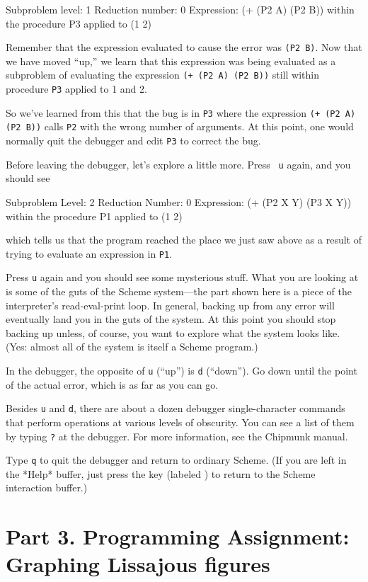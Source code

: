 \beginlisp
Subproblem level: 1 Reduction number: 0
Expression:
(+ (P2 A) (P2 B))
within the procedure P3
applied to (1 2)
\endlisp

Remember that the expression evaluated to cause the error was {\tt (P2
B)}.  Now that we have moved ``up,'' we learn that this expression was
being evaluated as a subproblem of evaluating the expression {\tt (+
(P2 A) (P2 B))} still within procedure {\tt P3} applied to 1 and 2.

So we've learned from this that the bug is in {\tt P3} where the
expression {\tt (+ (P2 A) (P2 B))} calls {\tt P2} with the wrong
number of arguments.  At this point, one would normally quit the
debugger and edit {\tt P3} to correct the bug.

Before leaving the debugger, let's explore a little more.  Press {\tt
u} again, and you should see

\beginlisp
Subproblem Level: 2  Reduction Number: 0
Expression:
(+ (P2 X Y) (P3 X Y))
within the procedure P1
applied to (1 2)
\endlisp

which tells us that the program reached the place we just saw above as
a result of trying to evaluate an expression in {\tt P1}.

Press {\tt u} again and you should see some mysterious stuff.  What
you are looking at is some of the guts of the Scheme system---the part
shown here is a piece of the interpreter's read-eval-print loop.
In general, backing up from any error will eventually land you in the
guts of the system.  At this point you should stop backing up unless,
of course, you want to explore what the system looks like.  (Yes:
almost all of the system is itself a Scheme program.)

In the debugger, the opposite of {\tt u} (``up'') is {\tt d}
(``down'').  Go down until the point of the actual error, which is as
far as you can go.

Besides {\tt u} and {\tt d}, there are about a dozen debugger single-character
commands that perform operations at various levels of obscurity.  You can see a
list of them by typing {\tt ?} at the debugger.  For more information, see the
Chipmunk manual.

Type {\tt q} to quit the debugger and return to ordinary Scheme.  (If you are
left in the *Help* buffer, just press the  key (labeled )
to return to the Scheme interaction buffer.)

\section{Part 3. Programming Assignment: Graphing Lissajous figures}


